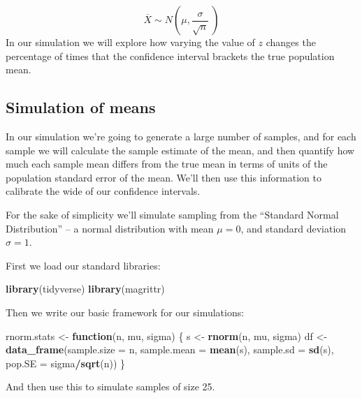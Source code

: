 \documentclass[]{book}
\newenvironment{Shaded}{\begin{snugshade}}{\end{snugshade}}
\newcommand{\ControlFlowTok}[1]{\textcolor[rgb]{0.13,0.29,0.53}{\textbf{#1}}}
\newcommand{\DataTypeTok}[1]{\textcolor[rgb]{0.13,0.29,0.53}{#1}}
\newcommand{\KeywordTok}[1]{\textcolor[rgb]{0.13,0.29,0.53}{\textbf{#1}}}
\newcommand{\NormalTok}[1]{#1}
\newcommand{\OperatorTok}[1]{\textcolor[rgb]{0.81,0.36,0.00}{\textbf{#1}}}
\newcommand{\StringTok}[1]{\textcolor[rgb]{0.31,0.60,0.02}{#1}}
\theoremstyle{definition}
\theoremstyle{definition}
\theoremstyle{definition}
\theoremstyle{remark}
\begin{document}
\[
\overline{X} \sim N \left( \mu, \frac{\sigma}{\sqrt{n}}\ \right)
\] In our simulation we will explore how varying the value of \(z\)
changes the percentage of times that the confidence interval brackets
the true population mean.

\hypertarget{simulation-of-means}{%
\subsection{Simulation of means}\label{simulation-of-means}}

In our simulation we're going to generate a large number of samples, and
for each sample we will calculate the sample estimate of the mean, and
then quantify how much each sample mean differs from the true mean in
terms of units of the population standard error of the mean. We'll then
use this information to calibrate the wide of our confidence intervals.

For the sake of simplicity we'll simulate sampling from the ``Standard
Normal Distribution'' -- a normal distribution with mean \(\mu=0\), and
standard deviation \(\sigma=1\).

First we load our standard libraries:

\begin{Shaded}
\begin{Highlighting}[]
\KeywordTok{library}\NormalTok{(tidyverse)}
\KeywordTok{library}\NormalTok{(magrittr)}
\end{Highlighting}
\end{Shaded}

Then we write our basic framework for our simulations:

\begin{Shaded}
\begin{Highlighting}[]
\NormalTok{rnorm.stats <-}\StringTok{ }\ControlFlowTok{function}\NormalTok{(n, mu, sigma) \{}
\NormalTok{  s <-}\StringTok{ }\KeywordTok{rnorm}\NormalTok{(n, mu, sigma)}
\NormalTok{  df <-}\StringTok{ }\KeywordTok{data_frame}\NormalTok{(}\DataTypeTok{sample.size =}\NormalTok{ n,}
                   \DataTypeTok{sample.mean =} \KeywordTok{mean}\NormalTok{(s),}
                   \DataTypeTok{sample.sd =} \KeywordTok{sd}\NormalTok{(s),}
                   \DataTypeTok{pop.SE =}\NormalTok{ sigma}\OperatorTok{/}\KeywordTok{sqrt}\NormalTok{(n))}
\NormalTok{\}}
\end{Highlighting}
\end{Shaded}

And then use this to simulate samples of size 25.
\end{document}
